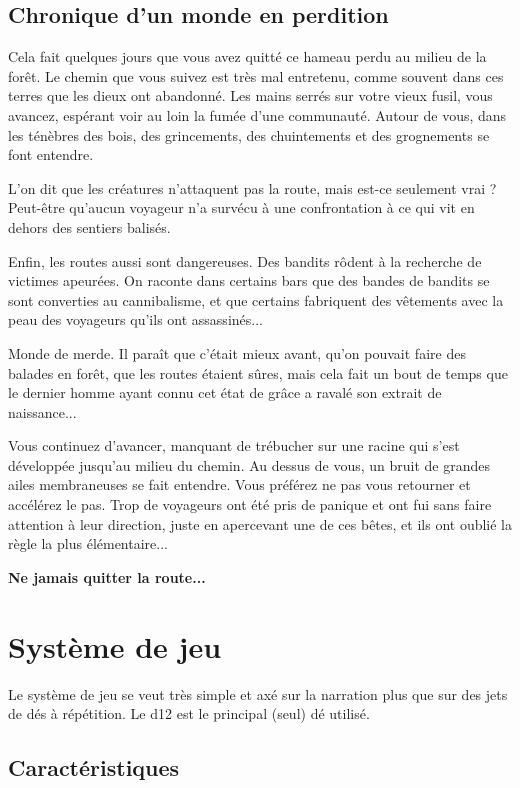 \documentclass[a4paper,10pt,twoside,twocolumn,openany,bg=print]{dndbook}
\begin{document}
\section*{Chronique d'un monde en perdition}

Cela fait quelques jours que vous avez quitté ce hameau perdu au milieu de la forêt. Le chemin que vous suivez est très mal entretenu, comme souvent dans ces terres que les dieux ont abandonné. Les mains serrés sur votre vieux fusil, vous avancez, espérant voir au loin la fumée d'une communauté. Autour de vous, dans les ténèbres des bois, des grincements, des chuintements et des grognements se font entendre.

L'on dit que les créatures n'attaquent pas la route, mais est-ce seulement vrai ? Peut-être qu'aucun voyageur n'a survécu à une confrontation à ce qui vit en dehors des sentiers balisés.

Enfin, les routes aussi sont dangereuses. Des bandits rôdent à la recherche de victimes apeurées. On raconte dans certains bars que des bandes de bandits se sont converties au cannibalisme, et que certains fabriquent des vêtements avec la peau des voyageurs qu'ils ont assassinés...

Monde de merde. Il paraît que c'était mieux avant, qu'on pouvait faire des balades en forêt, que les routes étaient sûres, mais cela fait un bout de temps que le dernier homme ayant connu cet état de grâce a ravalé son extrait de naissance...

Vous continuez d'avancer, manquant de trébucher sur une racine qui s'est développée jusqu'au milieu du chemin. Au dessus de vous, un bruit de grandes ailes membraneuses se fait entendre. Vous préférez ne pas vous retourner et accélérez le pas. Trop de voyageurs ont été pris de panique et ont fui sans faire attention à leur direction, juste en apercevant une de ces bêtes, et ils ont oublié la règle la plus élémentaire...

\textbf{Ne jamais quitter la route...}

\tableofcontents

\chapter{Système de jeu}

Le système de jeu se veut très simple et axé sur la narration plus que sur des jets de dés à répétition. Le d12 est le principal (seul) dé utilisé. 

\section{Caractéristiques}
\end{document}
